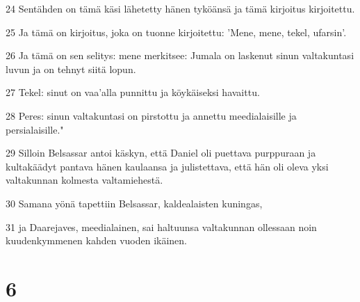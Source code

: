 \par 24 Sentähden on tämä käsi lähetetty hänen tyköänsä ja tämä kirjoitus kirjoitettu.
\par 25 Ja tämä on kirjoitus, joka on tuonne kirjoitettu: 'Mene, mene, tekel, ufarsin'.
\par 26 Ja tämä on sen selitys: mene merkitsee: Jumala on laskenut sinun valtakuntasi luvun ja on tehnyt siitä lopun.
\par 27 Tekel: sinut on vaa'alla punnittu ja köykäiseksi havaittu.
\par 28 Peres: sinun valtakuntasi on pirstottu ja annettu meedialaisille ja persialaisille."
\par 29 Silloin Belsassar antoi käskyn, että Daniel oli puettava purppuraan ja kultakäädyt pantava hänen kaulaansa ja julistettava, että hän oli oleva yksi valtakunnan kolmesta valtamiehestä.
\par 30 Samana yönä tapettiin Belsassar, kaldealaisten kuningas,
\par 31 ja Daarejaves, meedialainen, sai haltuunsa valtakunnan ollessaan noin kuudenkymmenen kahden vuoden ikäinen.

\chapter{6}

